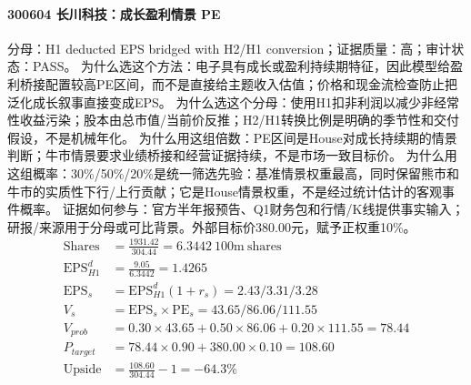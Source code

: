 \paragraph{300604 长川科技：成长盈利情景 PE}
分母：H1 deducted EPS bridged with H2/H1 conversion；证据质量：高；审计状态：PASS。
为什么选这个方法：电子具有成长或盈利持续期特征，因此模型给盈利桥接配置较高PE区间，而不是直接给主题收入估值；价格和现金流检查防止把泛化成长叙事直接变成EPS。
为什么选这个分母：使用H1扣非利润以减少非经常性收益污染；股本由总市值/当前价反推；H2/H1转换比例是明确的季节性和交付假设，不是机械年化。
为什么用这组倍数：PE区间是House对成长持续期的情景判断；牛市情景要求业绩桥接和经营证据持续，不是市场一致目标价。
为什么用这组概率：30\%/50\%/20\%是统一筛选先验：基准情景权重最高，同时保留熊市和牛市的实质性下行/上行贡献；它是House情景权重，不是经过统计估计的客观事件概率。
证据如何参与：官方半年报预告、Q1财务包和行情/K线提供事实输入；研报/来源用于分母或可比背景。外部目标价380.00元，赋予正权重10\%。
\begin{align*}
\mathrm{Shares} &= \frac{1931.42}{304.44}=6.3442\ \mathrm{100m\ shares}\\
\mathrm{EPS}_{H1}^d &= \frac{9.05}{6.3442}=1.4265\\
\mathrm{EPS}_s &= \mathrm{EPS}_{H1}^d(1+r_s)=2.43/3.31/3.28\\
V_s &= \mathrm{EPS}_s\times \mathrm{PE}_s=43.65/86.06/111.55\\
V_{prob} &= 0.30\times 43.65+0.50\times 86.06+0.20\times 111.55=78.44\\
P_{target} &= 78.44\times 0.90+380.00\times 0.10=108.60\\
\mathrm{Upside} &= \frac{108.60}{304.44}-1=-64.3\%\\
\end{align*}

